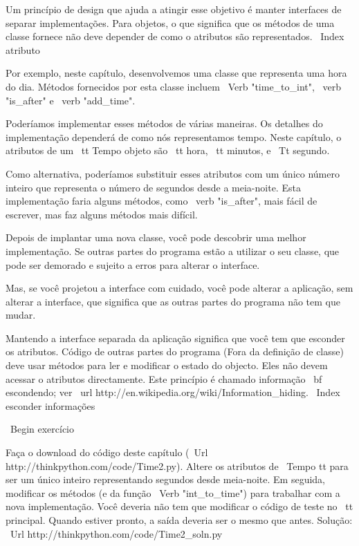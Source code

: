 \documentclass[10pt]{book}
\begin{document}
{{{{{{{{{{{{{{Um princípio de design que ajuda a atingir esse objetivo é manter
interfaces de separar implementações. Para objetos, o que significa
que os métodos de uma classe fornece não deve depender de como o
atributos são representados.
\ Index {atributo}

Por exemplo, neste capítulo, desenvolvemos uma classe que representa
uma hora do dia. Métodos fornecidos por esta classe incluem
\ Verb "time_to_int", \ verb "is_after" e \ verb "add_time".

Poderíamos implementar esses métodos de várias maneiras. Os detalhes do
implementação dependerá de como nós representamos tempo. Neste capítulo, o
atributos de um {\ tt Tempo} objeto são {\ tt hora}, {\ tt minutos}, e
{\ Tt segundo}.

Como alternativa, poderíamos substituir esses atributos com
um único número inteiro que representa o número de segundos
desde a meia-noite. Esta implementação faria alguns métodos,
como \ verb "is_after", mais fácil de escrever, mas faz alguns métodos
mais difícil.

Depois de implantar uma nova classe, você pode descobrir uma melhor
implementação. Se outras partes do programa estão a utilizar o seu
classe, que pode ser demorado e sujeito a erros para alterar o
interface.  

Mas, se você projetou a interface com cuidado, você pode
alterar a aplicação, sem alterar a interface, que
significa que as outras partes do programa não tem que mudar.

Mantendo a interface separada da aplicação significa que
você tem que esconder os atributos. Código de outras partes do programa
(Fora da definição de classe) deve usar métodos para ler
e modificar o estado do objecto. Eles não devem acessar o
atributos directamente. Este princípio é chamado {informação \ bf escondendo};
ver \ url {http://en.wikipedia.org/wiki/Information_hiding}.
\ Index {esconder informações}

\ Begin {} exercício

Faça o download do código deste capítulo
(\ Url {http://thinkpython.com/code/Time2.py}). Altere os atributos
de {\ Tempo tt} para ser um único inteiro representando segundos desde
meia-noite. Em seguida, modificar os métodos (e da função
\ Verb "int_to_time") para trabalhar com a nova implementação. Você deveria
não tem que modificar o código de teste no {\ tt principal}. Quando estiver pronto,
a saída deveria ser o mesmo que antes. Solução:
\ Url {http://thinkpython.com/code/Time2_soln.py}

}}}}}}}}}}}}}}
\end{document}
